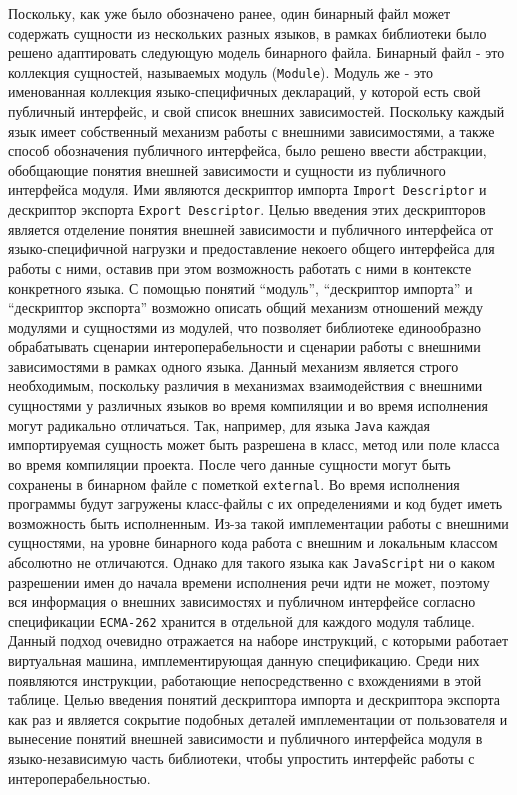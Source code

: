 Поскольку, как уже было обозначено ранее, один бинарный файл может содержать сущности из нескольких разных языков, в рамках библиотеки было решено адаптировать следующую модель бинарного файла. Бинарный файл - это коллекция сущностей, называемых модуль (\texttt{Module}). Модуль же - это именованная коллекция языко-специфичных деклараций, у которой есть свой публичный интерфейс, и свой список внешних зависимостей. Поскольку каждый язык имеет собственный механизм работы с внешними зависимостями, а также способ обозначения публичного интерфейса, было решено ввести абстракции, обобщающие понятия внешней зависимости и сущности из публичного интерфейса модуля. Ими являются дескриптор импорта \texttt{Import~Descriptor} и дескриптор экспорта \texttt{Export~Descriptor}. Целью введения этих дескрипторов является отделение понятия внешней зависимости и публичного интерфейса от языко-специфичной нагрузки и предоставление некоего общего интерфейса для работы с ними, оставив при этом возможность работать с ними в контексте конкретного языка. С помощью понятий ``модуль'', ``дескриптор импорта'' и ``дескриптор экспорта'' возможно описать общий механизм отношений между модулями и сущностями из модулей, что позволяет библиотеке единообразно обрабатывать сценарии интероперабельности и сценарии работы с внешними зависимостями в рамках одного языка. Данный механизм является строго необходимым, поскольку различия в механизмах взаимодействия с внешними сущностями у различных языков во время компиляции и во время исполнения могут радикально отличаться. Так, например, для языка \texttt{Java} каждая импортируемая сущность может быть разрешена в класс, метод или поле класса во время компиляции проекта. После чего данные сущности могут быть сохранены в бинарном файле с пометкой \texttt{external}. Во время исполнения программы будут загружены класс-файлы с их определениями и код будет иметь возможность быть исполненным. Из-за такой имплементации работы с внешними сущностями, на уровне бинарного кода работа с внешним и локальным классом абсолютно не отличаются. Однако для такого языка как \texttt{JavaScript} ни о каком разрешении имен до начала времени исполнения речи идти не может, поэтому вся информация о внешних зависимостях и публичном интерфейсе согласно спецификации \texttt{ECMA-262} хранится в отдельной для каждого модуля таблице. Данный подход очевидно отражается на наборе инструкций, с которыми работает виртуальная машина, имплементирующая данную спецификацию. Среди них появляются инструкции, работающие непосредственно с вхождениями в этой таблице. Целью введения понятий дескриптора импорта и дескриптора экспорта как раз и является сокрытие подобных деталей имплементации от пользователя и вынесение понятий внешней зависимости и публичного интерфейса модуля в языко-независимую часть библиотеки, чтобы упростить интерфейс работы с интероперабельностью.

